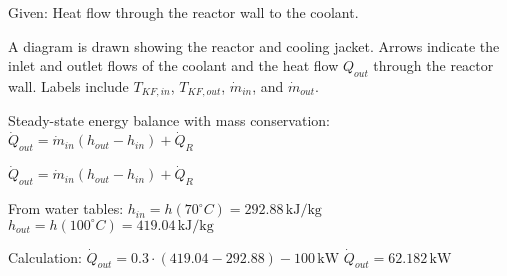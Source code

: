 Given: Heat flow through the reactor wall to the coolant.  

A diagram is drawn showing the reactor and cooling jacket. Arrows indicate the inlet and outlet flows of the coolant and the heat flow \( Q_{out} \) through the reactor wall. Labels include \( T_{KF,in} \), \( T_{KF,out} \), \( \dot{m}_{in} \), and \( \dot{m}_{out} \).  

Steady-state energy balance with mass conservation:  
\( \dot{Q}_{out} = \dot{m}_{in} (h_{out} - h_{in}) + \dot{Q}_R \)  

\( \dot{Q}_{out} = \dot{m}_{in} (h_{out} - h_{in}) + \dot{Q}_R \)  

From water tables:  
\( h_{in} = h(70^\circ C) = 292.88 \, \text{kJ/kg} \)  
\( h_{out} = h(100^\circ C) = 419.04 \, \text{kJ/kg} \)  

Calculation:  
\( \dot{Q}_{out} = 0.3 \cdot (419.04 - 292.88) - 100 \, \text{kW} \)  
\( \dot{Q}_{out} = 62.182 \, \text{kW} \)